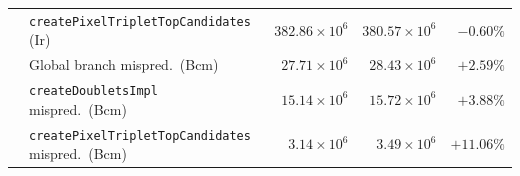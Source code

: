 \begin{tabular}{llrrr}
    \rowcolor{gray!15}
& \texttt{createPixelTripletTopCandidates} (Ir) & $382.86 \times 10^{6}$ & $380.57 \times 10^{6}$ & $-0.60\%$ \\
    & Global branch mispred.\ (Bcm) & $27.71 \times 10^{6}$ & $28.43 \times 10^{6}$ & $+2.59\%$ \\
    \rowcolor{gray!15}
& \texttt{createDoubletsImpl} mispred.\ (Bcm) & $15.14 \times 10^{6}$ & $15.72 \times 10^{6}$ & $+3.88\%$ \\
    & \texttt{createPixelTripletTopCandidates} mispred.\ (Bcm) & $3.14 \times 10^{6}$ & $3.49 \times 10^{6}$ & $+11.06\%$ \\
    \bottomrule
\end{tabular}
